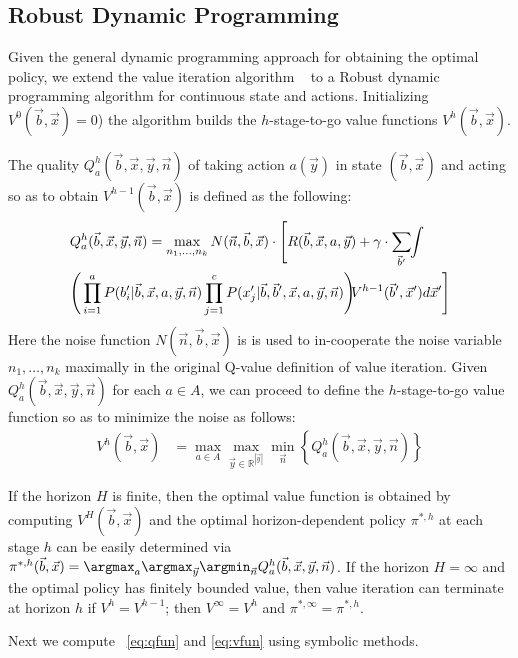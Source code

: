 \subsection{Robust Dynamic Programming}

Given the general dynamic programming approach for obtaining the optimal policy, we extend the value iteration algorithm ~\cite{bellman} to a Robust dynamic programming algorithm for continuous state and actions. Initializing $V^0(\vec{b},\vec{x}) = 0$) the algorithm builds the $h$-stage-to-go value functions $V^h(\vec{b},\vec{x})$.

The quality $Q_a^{h}(\vec{b},\vec{x},\vec{y},\vec{n})$ of taking action $a(\vec{y})$ in state $(\vec{b},\vec{x})$ and acting so as to obtain $V^{h-1}(\vec{b},\vec{x})$ is defined as the following:
\vspace{-4mm}
{\footnotesize
\begin{align}
& Q_a^{h}(\vec{b},\vec{x},\vec{y},\vec{n}) = \max_{n_1,\ldots, n_k} N(\vec{n},\vec{b},\vec{x}) \cdot \Bigg[ R(\vec{b},\vec{x},a,\vec{y}) + \gamma \cdot \sum_{\vec{b}'} \hspace{-1.0mm} \int \hspace{-1.0mm} \nonumber \\
&\Bigg( \prod_{i=1}^a P(b_i'|\vec{b},\vec{x},a,\vec{y},\vec{n})     
\prod_{j=1}^c P(x_j'|\vec{b},\vec{b}',\vec{x},a,\vec{y},\vec{n}) \Bigg)  \hspace{-1.0mm} V^{h-1}(\vec{b}',\vec{x}') d\vec{x}' \Bigg] \hspace{-0.2mm} \label{eq:qfun} 
\end{align}}
Here the noise function $N(\vec{n},\vec{b},\vec{x})$ is is used to in-cooperate the noise variable $n_1,\ldots,n_k$ maximally in the original Q-value definition of value iteration. Given $Q_a^h(\vec{b},\vec{x},\vec{y},\vec{n})$ for each $a \in A$, we can proceed to define the $h$-stage-to-go value function so as to minimize the noise as follows:
\begin{align}
V^{h}(\vec{b},\vec{x}) & = \max_{a \in A} \max_{\vec{y} \in \mathbb{R}^{|\vec{y}|}} \min_{\vec{n}} \left\{ Q^{h}_a(\vec{b},\vec{x},\vec{y},\vec{n}) \right\} \label{eq:vfun}
\end{align}

If the horizon $H$ is finite, then the optimal value function is
obtained by computing $V^H(\vec{b},\vec{x})$ and the optimal
horizon-dependent policy $\pi^{*,h}$ at each stage $h$ can be easily
determined via $\pi^{*,h}(\vec{b},\vec{x}) = \argmax_a
\argmax_{\vec{y}}\argmin_{\vec{n}} Q^h_a(\vec{b},\vec{x},\vec{y},\vec{n})$.  If the horizon $H
= \infty$ and the optimal policy has finitely bounded value, then
value iteration can terminate at horizon $h$ if $V^{h} = V^{h-1}$;
then $V^\infty = V^h$ and $\pi^{*,\infty} = \pi^{*,h}$.

Next  we compute ~\eqref{eq:qfun} and \eqref{eq:vfun} using symbolic methods.